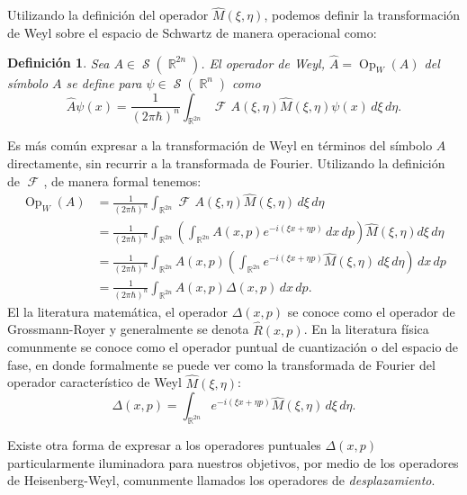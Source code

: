 \documentclass[a4paper]{report}
\DeclareMathOperator{\R}{\mathbb{R}}
\DeclareMathOperator{\Sz}{\mathcal S}
\DeclareMathOperator{\Op}{Op}
\DeclareMathOperator{\Fr}{\mathcal{F}\!}
\newtheorem{definition}{Definición}
\begin{document}
  Utilizando la definición del operador $\hat{M}(\xi,\eta)$,
  podemos definir la transformación de Weyl sobre el espacio
  de Schwartz de manera operacional como:
  \begin{definition}
    Sea $A \in \Sz(\R^{2n})$. El operador de Weyl, $\hat{A}
    = \Op_W(A)$ del símbolo $A$ se define para $\psi \in
    \Sz(\R^{n})$ como
    \begin{equation}
      \label{eqn:weyl_quant_2}
      \hat{A}\psi(x)
      = \frac{1}{(2\pi\hbar)^{n}}
      \int_{\R^{2n}} \Fr A(\xi,\eta) \hat{M}(\xi,\eta)
      \psi(x) \, d\xi \, d\eta.
    \end{equation}
  \end{definition}
  Es más común expresar a la transformación de Weyl en términos
  del símbolo $A$ directamente, sin recurrir a la
  transformada de Fourier. Utilizando la definición de $\Fr$,
  de manera formal tenemos:
  \begin{align*}
    \Op_W(A)
    &= \frac{1}{(2\pi\hbar)^{n}} \int_{\R^{2n}} \Fr
    A(\xi,\eta)\hat{M}(\xi,\eta) \, d\xi \, d\eta \\
    &= \frac{1}{(2\pi\hbar)^{n}} \int_{\R^{2n}} \left(
    \int_{\R^{2n}} A(x,p)e^{-i(\xi x + \eta p)} \, dx \, dp
    \right) \hat{M}(\xi,\eta) d\xi \, d\eta \\
    &= \frac{1}{(2\pi\hbar)^{n}} \int_{\R^{2n}} A(x,p) \left(
    \int_{\R^{2n}} e^{-i(\xi x + \eta p)} \hat{M}(\xi,\eta)
    \, d\xi \, d\eta \right) \, dx \, dp \\
    &= \frac{1}{(2\pi\hbar)^{n}} \int_{\R^{2n}} A(x,p)
    \Delta(x,p) \, dx \, dp.
  \end{align*} 
  El la literatura matemática, el operador $\Delta(x,p)$ se
  conoce como el operador de Grossmann-Royer y generalmente
  se denota $\hat{R}(x,p)$. En la literatura física
  comunmente se conoce como el operador puntual de
  cuantización o del espacio de fase, en donde formalmente
  se puede ver como la transformada de Fourier del operador
  característico de Weyl $\hat{M}(\xi,\eta)$:
  \begin{equation}
    \label{eqn:phase_point_operator}
    \Delta(x,p)
    = \int_{\R^{2n}} e^{-i(\xi x + \eta p)}
    \hat{M}(\xi,\eta) \, d\xi \, d\eta.
  \end{equation}

  Existe otra forma de expresar a los operadores puntuales
  $\Delta(x,p)$ particularmente iluminadora para nuestros
  objetivos, por medio de los operadores de Heisenberg-Weyl,
  comunmente llamados los operadores de
  \textit{desplazamiento}.
\end{document}
